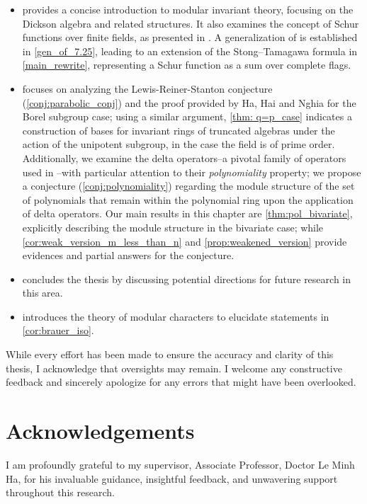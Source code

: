 \documentclass[12pt,a4paper]{report}
\theoremstyle{definition}
\theoremstyle{remark}
\theoremstyle{definition}
\begin{document}
\begin{itemize}
    \item {} provides a concise introduction to modular invariant theory, focusing on the Dickson algebra and related structures. It also examines the concept of Schur functions over finite fields, as presented in \cite{macdonald_schur_1992}. A generalization of \cite[Conjecture (7.25)]{macdonald_schur_1992} is established in \cref{gen_of_7.25}, leading to an extension of the Stong–Tamagawa formula in \cref{main_rewrite}, representing a Schur function as a sum over complete flags.
    \item {} focuses on analyzing the Lewis-Reiner-Stanton conjecture (\cref{conj:parabolic_conj}) and the proof provided by Ha, Hai and Nghia \cite{Ha_Hai_Nghia_2024} for the Borel subgroup case; using a similar argument, \cref{thm: q=p_case} indicates a construction of bases for invariant rings of truncated algebras under the action of the unipotent subgroup, in the case the field is of prime order. Additionally, we examine the delta operators--a pivotal family of operators used in \cite{Ha_Hai_Nghia_2024}--with particular attention to their \emph{polynomiality} property; we propose a conjecture (\cref{conj:polynomiality}) regarding the module structure of the set of polynomials that remain within the polynomial ring upon the application of delta operators. Our main results in this chapter are \cref{thm:pol_bivariate}, explicitly describing the module structure in the bivariate case; while \cref{cor:weak_version_m_less_than_n} and \cref{prop:weakened_version} provide evidences and partial answers for the conjecture.
    \item {} concludes the thesis by discussing potential directions for future research in this area.
    \item {} introduces the theory of modular characters to elucidate statements in \cref{cor:brauer_iso}. 
\end{itemize}
While every effort has been made to ensure the accuracy and clarity of this thesis, I acknowledge that oversights may remain. I welcome any constructive feedback and sincerely apologize for any errors that might have been overlooked.
\chapter*{Acknowledgements}
I am profoundly grateful to my supervisor, Associate Professor, Doctor Le Minh Ha, for his invaluable guidance, insightful feedback, and unwavering support throughout this research. 
\end{document}
